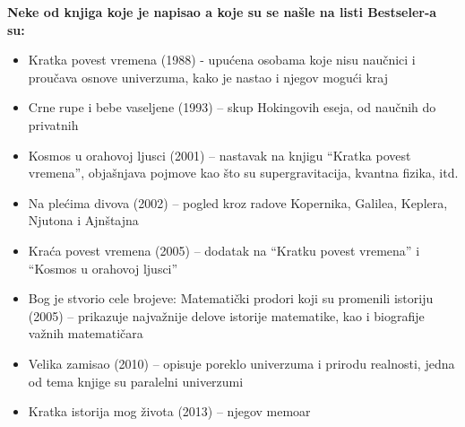 \documentclass[a4paper, 12pt]{article}
\begin{document}
{\vspace{1cm}
\textbf{Neke od knjiga koje je napisao a koje su se našle na listi Bestseler-a su:} 
\begin{itemize}
 \item Kratka povest vremena (1988) - upućena osobama koje nisu naučnici i proučava osnove univerzuma, kako je nastao i njegov mogući kraj
 \item Crne rupe i bebe vaseljene (1993) – skup Hokingovih eseja, od naučnih do privatnih
 \item Kosmos u orahovoj ljusci (2001) – nastavak na knjigu “Kratka povest vremena”, objašnjava pojmove kao što su supergravitacija, kvantna fizika, itd.
 \item Na plećima divova (2002) – pogled kroz radove Kopernika, Galilea, Keplera, Njutona i Ajnštajna
 \item Kraća povest vremena (2005) – dodatak na “Kratku povest vremena” i “Kosmos u orahovoj ljusci”
 \item Bog je stvorio cele brojeve: Matematički prodori koji su promenili istoriju (2005) –  prikazuje najvažnije delove istorije matematike, kao i biografije važnih matematičara
 \item Velika zamisao (2010) – opisuje poreklo univerzuma i prirodu realnosti, jedna od tema knjige su paralelni univerzumi
 \item Kratka istorija mog života (2013) – njegov memoar
\end{itemize}

}
\end{document}
